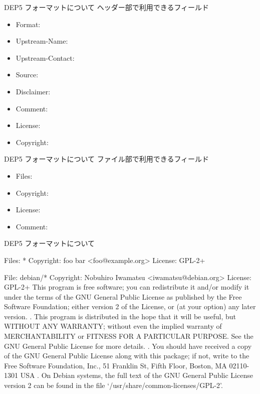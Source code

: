 \begin{frame}{DEP5 フォーマットについて}
ヘッダー部で利用できるフィールド
\begin{itemize}
  \item Format:
  \item Upstream-Name:
  \item Upstream-Contact:
  \item Source:
  \item Disclaimer:
  \item Comment:
  \item License:
  \item Copyright:
\end{itemize}
\end{frame}

\begin{frame}{DEP5 フォーマットについて}
ファイル部で利用できるフィールド
\begin{itemize}
  \item  Files:
  \item  Copyright:
  \item  License:
  \item  Comment:
\end{itemize}
\end{frame}

\begin{frame}[containsverbatim]{DEP5 フォーマットについて}
\begin{commandlinesmall}
Files: *
Copyright: foo bar <foo@example.org>
License: GPL-2+

File: debian/*
Copyright: Nobuhiro Iwamatsu <iwamatsu@debian.org>
License: GPL-2+
 This program is free software; you can redistribute it
 and/or modify it under the terms of the GNU General Public
 License as published by the Free Software Foundation; either
 version 2 of the License, or (at your option) any later
 version.
 .
 This program is distributed in the hope that it will be
 useful, but WITHOUT ANY WARRANTY; without even the implied
 warranty of MERCHANTABILITY or FITNESS FOR A PARTICULAR
 PURPOSE.  See the GNU General Public License for more
 details.
 .
 You should have received a copy of the GNU General Public
 License along with this package; if not, write to the Free
 Software Foundation, Inc., 51 Franklin St, Fifth Floor,
 Boston, MA  02110-1301 USA
 .
 On Debian systems, the full text of the GNU General Public
 License version 2 can be found in the file
 `/usr/share/common-licenses/GPL-2'.
\end{commandlinesmall}
\end{frame}

